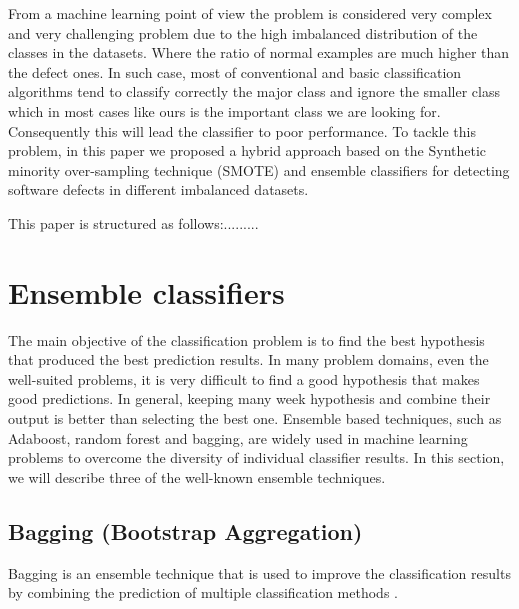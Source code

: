 \documentclass[runningheads,a4paper]{llncs}
\begin{document}


 
 From a machine learning point of view the problem is considered very complex and very challenging problem due to the high imbalanced distribution of the classes in the datasets. Where the ratio of normal examples are much higher than the defect ones. In such case, most of conventional and basic classification algorithms tend to classify correctly the major class and ignore the smaller class which in most cases like ours is the important class we are looking for. Consequently this will lead the classifier to poor performance. To tackle this problem, in this paper we proposed a hybrid approach based on the Synthetic minority over-sampling technique (SMOTE) and ensemble classifiers for detecting software defects in different imbalanced datasets.
 

This paper is structured as follows:.........






\section{Ensemble classifiers}
\label{ensembles}

The main objective of the classification problem is to find the best hypothesis that produced the best prediction results. In many problem domains, even the well-suited problems, it is very difficult to find a good hypothesis that makes good predictions. In general, keeping many week hypothesis and combine their output is better than selecting the best one.
Ensemble based techniques, such as Adaboost, random forest and bagging, are widely used in machine learning problems to overcome the diversity of individual classifier results. In this section, we will describe three of the well-known ensemble techniques.
\subsection{Bagging (Bootstrap Aggregation)}
Bagging is an ensemble technique that is used to improve the classification results by combining the prediction of multiple classification methods \cite{Breiman1996}.
\end{document}
